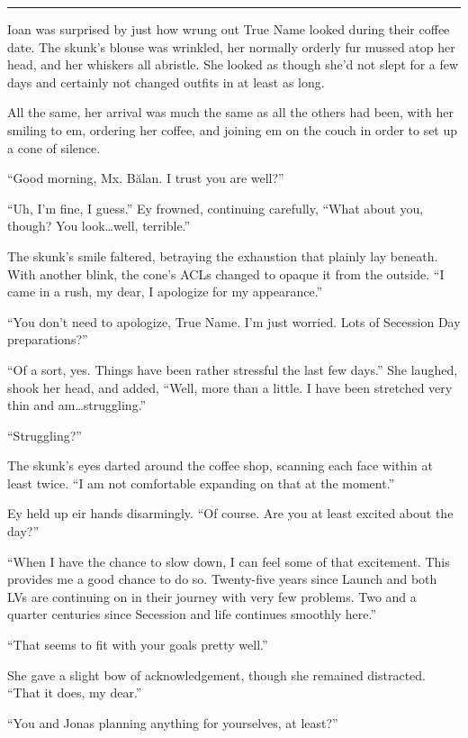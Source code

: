 \begin{center}\rule{0.5\linewidth}{0.5pt}\end{center}

Ioan was surprised by just how wrung out True Name looked during their coffee date. The skunk's blouse was wrinkled, her normally orderly fur mussed atop her head, and her whiskers all abristle. She looked as though she'd not slept for a few days and certainly not changed outfits in at least as long.

All the same, her arrival was much the same as all the others had been, with her smiling to em, ordering her coffee, and joining em on the couch in order to set up a cone of silence.

``Good morning, Mx. Bălan. I trust you are well?''

``Uh, I'm fine, I guess.'' Ey frowned, continuing carefully, ``What about you, though? You look\ldots well, terrible.''

The skunk's smile faltered, betraying the exhaustion that plainly lay beneath. With another blink, the cone's ACLs changed to opaque it from the outside. ``I came in a rush, my dear, I apologize for my appearance.''

``You don't need to apologize, True Name. I'm just worried. Lots of Secession Day preparations?''

``Of a sort, yes. Things have been rather stressful the last few days.'' She laughed, shook her head, and added, ``Well, more than a little. I have been stretched very thin and am\ldots struggling.''

``Struggling?''

The skunk's eyes darted around the coffee shop, scanning each face within at least twice. ``I am not comfortable expanding on that at the moment.''

Ey held up eir hands disarmingly. ``Of course. Are you at least excited about the day?''

``When I have the chance to slow down, I can feel some of that excitement. This provides me a good chance to do so. Twenty-five years since Launch and both LVs are continuing on in their journey with very few problems. Two and a quarter centuries since Secession and life continues smoothly here.''

``That seems to fit with your goals pretty well.''

She gave a slight bow of acknowledgement, though she remained distracted. ``That it does, my dear.''

``You and Jonas planning anything for yourselves, at least?''

